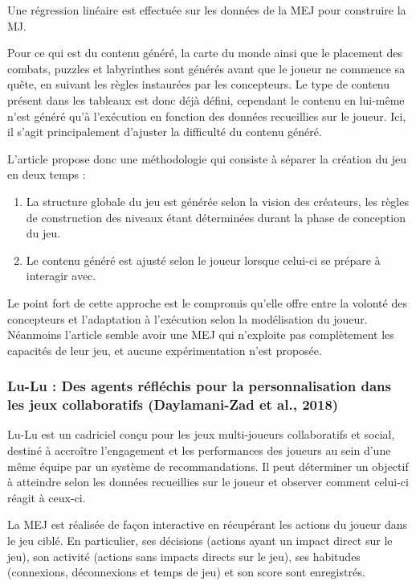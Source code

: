 \documentclass[a4paper,11pt]{article}
\begin{document}
        Une régression linéaire est effectuée sur les données de la MEJ pour construire la MJ.

        Pour ce qui est du contenu généré, la carte du monde ainsi que le placement des combats, puzzles et labyrinthes sont générés avant que le joueur ne commence sa quête, en suivant les règles instaurées par les concepteurs.
        Le type de contenu présent dans les tableaux est donc déjà défini, cependant le contenu en lui-même n'est généré qu'à l'exécution en fonction des données recueillies sur le joueur.
        Ici, il s'agit principalement d'ajuster la difficulté du contenu généré.

        L'article propose donc une méthodologie qui consiste à séparer la création du jeu en deux temps : 
        \begin{enumerate}
          \item La structure globale du jeu est générée selon la vision des créateurs, les règles de construction des niveaux étant déterminées durant la phase de conception du jeu.
          \item Le contenu généré est ajusté selon le joueur lorsque celui-ci se prépare à interagir avec.
        \end{enumerate}
        Le point fort de cette approche est le compromis qu'elle offre entre la volonté des concepteurs et l'adaptation à l'exécution selon la modélisation du joueur.
        Néanmoins l'article semble avoir une MEJ qui n'exploite pas complètement les capacités de leur jeu, et aucune expérimentation n'est proposée.
        
      \subsubsection{Lu-Lu : Des agents réfléchis pour la personnalisation dans les jeux collaboratifs (Daylamani-Zad et al., 2018)}

        Lu-Lu est un cadriciel conçu pour les jeux multi-joueurs collaboratifs et social, destiné à accroître l'engagement et les performances des joueurs au sein d'une même équipe par un système de recommandations.
        Il peut déterminer un objectif à atteindre selon les données recueillies sur le joueur et observer comment celui-ci réagit à ceux-ci.
      
        La MEJ est réalisée de façon interactive en récupérant les actions du joueur dans le jeu ciblé.
        En particulier, ses décisions (actions ayant un impact direct sur le jeu), son activité (actions sans impacts directs sur le jeu), ses habitudes (connexions, déconnexions et temps de jeu) et son score sont enregistrés.
      
\end{document}
